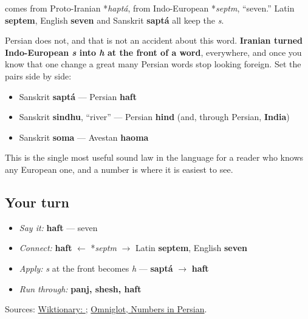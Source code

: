 \begin{cousinweb}
\textbf{} comes from Proto-Iranian *\emph{haptá}, from Indo-European *\emph{septm}, \textquotedblleft{}seven.\textquotedblright{} Latin \textbf{septem}, English \textbf{seven} and Sanskrit \textbf{saptá} all keep the \emph{s}.

Persian does not, and that is not an accident about this word. \textbf{Iranian turned Indo-European \emph{s} into \emph{h} at the front of a word}, everywhere, and once you know that one change a great many Persian words stop looking foreign. Set the pairs side by side:

\begin{itemize}
\raggedright
  \item Sanskrit \textbf{saptá} — Persian \textbf{haft}
  \item Sanskrit \textbf{sindhu}, \textquotedblleft{}river\textquotedblright{} — Persian \textbf{hind} (and, through Persian, \textbf{India})
  \item Sanskrit \textbf{soma} — Avestan \textbf{haoma}
\end{itemize}

This is the single most useful sound law in the language for a reader who knows any European one, and a number is where it is easiest to see.
\end{cousinweb}

\subsection*{Your turn}
\begin{itemize}
\raggedright
  \item \emph{Say it:} \textbf{haft} — seven
  \item \emph{Connect:} \textbf{haft} $\leftarrow$ *\emph{septm} $\to$ Latin \textbf{septem}, English \textbf{seven}
  \item \emph{Apply:} \emph{s} at the front becomes \emph{h} — \textbf{saptá} $\to$ \textbf{haft}
  \item \emph{Run through:} \textbf{panj, shesh, haft}
\end{itemize}

\begin{tcolorbox}[breakable,colback=teal!4,colframe=teal!35!black,title={Before you move on}]
Sources: \href{https://en.wiktionary.org/wiki/\%D9\%87\%D9\%81\%D8\%AA}{Wiktionary: }; \href{https://www.omniglot.com/language/numbers/persian.htm}{Omniglot, Numbers in Persian}.
\end{tcolorbox}
